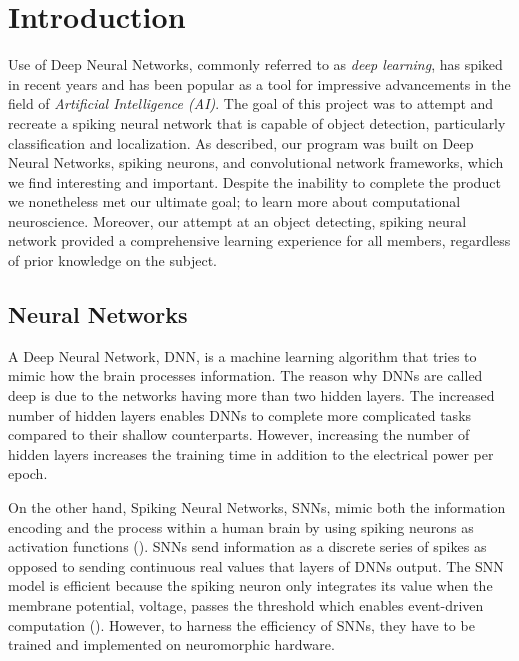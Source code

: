\section{Introduction}

Use of Deep Neural Networks, commonly referred to as
\emph{deep learning}, has spiked in recent years and has been popular
as a tool for impressive advancements in the field of 
\emph{Artificial Intelligence (AI)}.
The goal of this project was to attempt and recreate a spiking neural network that is capable of object detection, particularly classification and localization. As described, our program was built on Deep Neural Networks, spiking neurons, and convolutional network frameworks, which we find interesting and important. Despite the inability to complete the product we nonetheless met our ultimate goal; to learn more about computational neuroscience. Moreover, our attempt at an object detecting, spiking neural network provided a comprehensive learning experience for all members, regardless of prior knowledge on the subject. 

\subsection{Neural Networks}


A Deep Neural Network, DNN, is a machine learning algorithm that tries to mimic how the brain processes information. The reason why DNNs are called deep is due to the networks having more than two hidden layers. The increased number of hidden layers enables DNNs to complete more complicated tasks compared to their shallow counterparts. However, increasing the number of hidden layers increases the training time in addition to the electrical power per epoch. 


On the other hand, Spiking Neural Networks, SNNs, mimic both the information encoding and the process within a human brain by using spiking neurons as activation functions (). SNNs send information as a discrete series of spikes as opposed to sending continuous real values that layers of DNNs output. The SNN model is efficient because the spiking neuron only integrates its value when the membrane potential, voltage, passes the threshold which enables event-driven computation (). However, to harness the efficiency of SNNs, they have to be trained and implemented on neuromorphic hardware.

